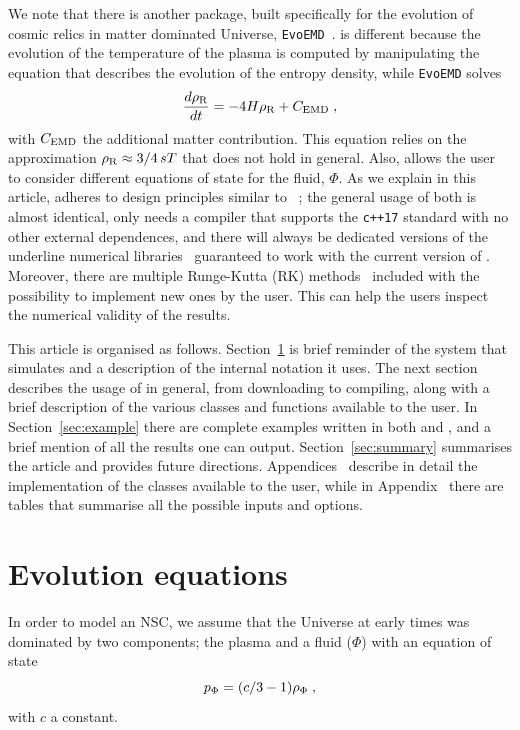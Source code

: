 \documentclass[11pt,a4paper]{article}
\begin{document}
We note that there is another package, built specifically for the evolution of cosmic relics in matter dominated Universe, {\tt EvoEMD}~\cite{Dutra:2021phm}. \nsc is different because the evolution of the temperature of the plasma is computed by manipulating the equation that describes the evolution of the entropy density, while {\tt EvoEMD} solves
%
\begin{equation}
	\dfrac{d\rho_{\rm R}}{dt} = -4H\rho_{\rm R} + C_{\rm EMD} \;,
	\label{eq:EvoMD}
\end{equation}
%
with  $C_{\rm EMD}$ the additional matter contribution. This equation relies on the approximation $\rho_{\rm R} \approx 3/4 \, sT$ that does not hold in general. Also, \nsc allows the user to consider different equations of state for the fluid, $\Phi$. 
%
As we explain in this article, \nsc adheres to design principles similar to \mimes~\cite{Karamitros:2021nxi}; \ie the general usage of both is almost identical, \nsc only needs a \CPP compiler that supports the {\tt c++17} standard with no other external dependences, and there will always be dedicated versions of the underline numerical libraries~\cite{NaBBODES,SimpleSplines} guaranteed to work with the current version of \nsc. Moreover, there are multiple Runge-Kutta (RK) methods~\cite{NaBBODES} included with the possibility to implement new ones by the user. This can help the users inspect the numerical validity of the results.

This article is organised as follows. Section~\ref{sec:equations} is brief reminder of the system that \nsc simulates and a description of the internal notation it uses. The next section describes the usage of \nsc in general, from downloading to compiling, along with a brief description of the various classes and functions available to the user. In Section~\ref{sec:example} there are complete examples written in both \CPP and \PY, and a brief mention of all the results one can output. Section~\ref{sec:summary} summarises the article and provides future directions.
%
Appendices~ describe in detail the implementation of the classes available to the user, while in Appendix~ there are tables that summarise all the possible inputs and options. 

\section{Evolution equations}\label{sec:equations}
\setcounter{equation}{0}

In order to model an NSC, we assume that the Universe at early times was dominated by two components; the plasma and a fluid ($\Phi$) with an equation of state
%
\begin{equation}
	p_{\Phi} = (c/3-1) \rho_{\Phi} \;,
	\label{eq:EOS}
\end{equation}  
%
with $c$ a constant. 
\end{document}
